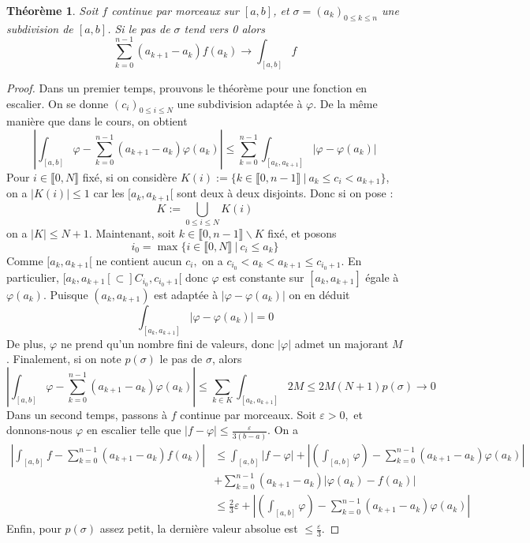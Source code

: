 \documentclass[french]{book}
\theoremstyle{plain}
\newtheorem{thm}{Théorème}[chapter]
\theoremstyle{definition}
\theoremstyle{remark}
\begin{document}
\begin{thm}
	Soit $f$ continue par morceaux sur $[a, b]$, et $\sigma = (a_k)_{0 \leqslant k \leqslant n}$ une subdivision de $[a, b]$. Si le pas de $\sigma$ tend vers 0 alors $$\sum_{k=0}^{n-1}(a_{k+1}-a_k)f(a_k) \rightarrow \int_{[a,b]}f$$
\end{thm}
\begin{proof}
	Dans un premier temps, prouvons le théorème pour une fonction en escalier. On se donne $(c_i)_{0 \leqslant i \leqslant N}$ une subdivision adaptée à $\varphi$. De la même manière que dans le cours, on obtient $$\left\lvert\int_{[a,b]}\varphi - \sum_{k=0}^{n-1}(a_{k+1}-a_k)\varphi(a_k)\right\rvert \leqslant \sum_{k=0}^{n-1}\int_{[a_k,a_{k+1}]}\left\lvert\varphi - \varphi(a_k)\right\rvert$$
	Pour $i \in \llbracket0,N\rrbracket$ fixé, si on considère $K(i) := \{k \in \llbracket0,n-1\rrbracket\ | \ a_k \leqslant c_i < a_{k+1}\}$, on a $|K(i)| \leqslant 1$ car les $[a_k,a_{k+1}[$ sont deux à deux disjoints. Donc si on pose : $$K := \bigcup_{0 \leqslant i \leqslant N}K(i)$$ on a $|K| \leqslant N+1.$ Maintenant, soit $k \in \llbracket0,n-1\rrbracket \backslash K$ fixé, et posons $$i_0 = \max\{i \in \llbracket0,N\rrbracket\ |\ c_i \leqslant a_k\}$$ Comme $[a_k,a_{k+1}[$ ne contient aucun $c_i,$ on a $c_{i_0}< a_k < a_{k+1} \leqslant c_{i_{0}+1}$. En particulier, $[a_k,a_{k+1}[\subset]C_{i_{0}},c_{i_{0}+1}[$ donc $\varphi$ est constante sur $[a_k,a_{k+1}]$ égale à $\varphi(a_k)$. Puisque $(a_k,a_{k+1})$ est adaptée à $|\varphi - \varphi(a_k)|$ on en déduit $$\int_{[a_k,a_{k+1}]}|\varphi - \varphi(a_k)| = 0$$
	De plus, $\varphi$ ne prend qu'un nombre fini de valeurs, donc $|\varphi|$ admet un majorant $M$. Finalement, si on note $p(\sigma)$ le pas de $\sigma$, alors $$\left\lvert\int_{[a,b]}\varphi - \sum_{k=0}^{n-1}(a_{k+1}-a_k)\varphi(a_k)\right\rvert \leqslant \sum_{k \in K}\int_{[a_k,a_{k+1}]}2M \leqslant 2M(N+1)p(\sigma) \rightarrow 0$$
	Dans un second temps, passons à $f$ continue par morceaux. Soit $\varepsilon > 0,$ et donnons-nous $\varphi$ en escalier telle que $\displaystyle|f-\varphi| \leqslant \frac{\varepsilon}{3(b-a)}$. On a 
	\begin{align*}
		\left\lvert \int_{[a,b]}f - \sum_{k=0}^{n-1}(a_{k+1}-a_k)f(a_k)\right\rvert &\leqslant \int_{[a,b]}|f-\varphi| + \left\lvert\left(\int_{[a,b]}\varphi\right) - \sum_{k=0}^{n-1}(a_{k+1}-a_k)\varphi(a_k)\right\rvert\\
		&+ \sum_{k=0}^{n-1}(a_{k+1}-a_k)|\varphi(a_k)-f(a_k)| \\
		&\leqslant \frac{2}{3}\varepsilon + \left\lvert\left(\int_{[a,b]}\varphi\right) - \sum_{k=0}^{n-1}(a_{k+1}-a_k)\varphi(a_k)\right\rvert
	\end{align*}
	Enfin, pour $p(\sigma)$ assez petit, la dernière valeur absolue est $\displaystyle\leqslant \frac{\varepsilon}{3}$.
\end{proof}
\end{document}
